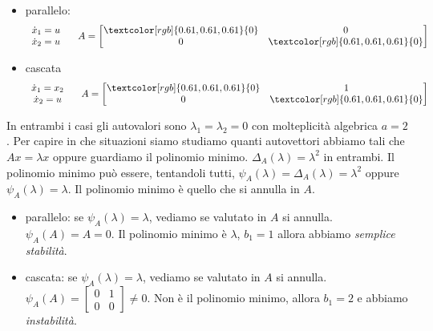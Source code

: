 \documentclass[10pt,a4paper]{book}
\begin{document}
\begin{itemize}
\item parallelo:\begin{equation*}
\begin{array}{ c }
\dot{x}_{1} =u\\
\dot{x}_{2} =u
\end{array} \ \ \ \ A=\begin{bmatrix}
\textcolor[rgb]{0.61,0.61,0.61}{0} & 0\\
0 & \textcolor[rgb]{0.61,0.61,0.61}{0}
\end{bmatrix}
\end{equation*}
\item cascata\begin{equation*}
\begin{array}{ c }
\dot{x}_{1} =x_{2}\\
\dot{x}_{2} =u
\end{array} \ \ \ \ A=\begin{bmatrix}
\textcolor[rgb]{0.61,0.61,0.61}{0} & 1\\
0 & \textcolor[rgb]{0.61,0.61,0.61}{0}
\end{bmatrix}
\end{equation*}
\end{itemize}

In entrambi i casi gli autovalori sono $\lambda _{1} =\lambda _{2} =0$ con molteplicità algebrica $a=2$. Per capire in che situazioni siamo studiamo quanti autovettori abbiamo tali che $Ax=\lambda x$ oppure guardiamo il polinomio minimo. $\Delta _{A}\left( \lambda \right) =\lambda ^{2}$ in entrambi. Il polinomio minimo può essere, tentandoli tutti, $\psi _{A}\left( \lambda \right) =\Delta _{A}\left( \lambda \right) =\lambda ^{2}$ oppure $\psi _{A}\left( \lambda \right) =\lambda $. Il polinomio minimo è quello che si annulla in $A$.
\begin{itemize}
\item parallelo: se $\psi _{A}\left( \lambda \right) =\lambda $, vediamo se valutato in $A$ si annulla. $\psi _{A}\left( A\right) =A=0$. Il polinomio minimo è $\lambda $, $b_{1} =1$ allora abbiamo \textit{semplice stabilità}.
\item cascata: se $\psi _{A}\left( \lambda \right) =\lambda $, vediamo se valutato in $A$ si annulla. $\psi _{A}\left( A\right) =\begin{bmatrix}
0 & 1\\
0 & 0
\end{bmatrix} \neq 0$. Non è il polinomio minimo, allora $b_{1} =2$ e abbiamo \textit{instabilità}.
\end{itemize}
\end{document}
